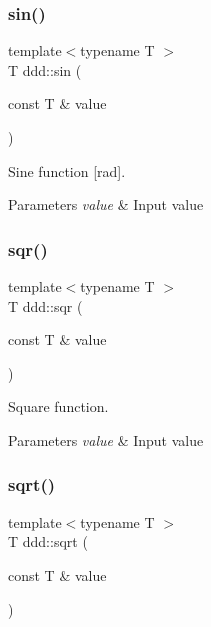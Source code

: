 \subsubsection{\texorpdfstring{sin()}{sin()}}
{\footnotesize\ttfamily template$<$typename T $>$ \\
T ddd\+::sin (\begin{DoxyParamCaption}\item[{const T \&}]{value }\end{DoxyParamCaption})\hspace{0.3cm}{\ttfamily [inline]}}



Sine function \mbox{[}rad\mbox{]}. 


\begin{DoxyParams}{Parameters}
{\em value} & Input value \\
\hline
\end{DoxyParams}
\mbox{\label{namespaceddd_a1d4703ab7fa9c58943ff44b368dacb4b}} 
\subsubsection{\texorpdfstring{sqr()}{sqr()}}
{\footnotesize\ttfamily template$<$typename T $>$ \\
T ddd\+::sqr (\begin{DoxyParamCaption}\item[{const T \&}]{value }\end{DoxyParamCaption})\hspace{0.3cm}{\ttfamily [inline]}}



Square function. 


\begin{DoxyParams}{Parameters}
{\em value} & Input value \\
\hline
\end{DoxyParams}
\mbox{\label{namespaceddd_a99ebeda8499ba29e0302f0f3c6e43549}} 
\subsubsection{\texorpdfstring{sqrt()}{sqrt()}}
{\footnotesize\ttfamily template$<$typename T $>$ \\
T ddd\+::sqrt (\begin{DoxyParamCaption}\item[{const T \&}]{value }\end{DoxyParamCaption})\hspace{0.3cm}{\ttfamily [inline]}}



